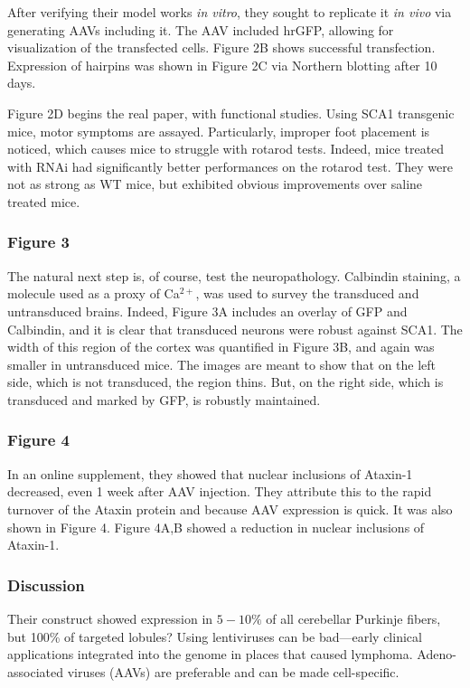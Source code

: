 \documentclass[12pt]{report}
\begin{document}
After verifying their model works \textit{in vitro}, they sought to replicate it \textit{in vivo} via generating AAVs including it. The AAV included hrGFP, allowing for visualization of the transfected cells. Figure 2B shows successful transfection. Expression of hairpins was shown in Figure 2C via Northern blotting after 10 days.\newline

Figure 2D begins the real paper, with functional studies. Using SCA1 transgenic mice, motor symptoms are assayed. Particularly, improper foot placement is noticed, which causes mice to struggle with rotarod tests. Indeed, mice treated with RNAi had significantly better performances on the rotarod test. They were not as strong as WT mice, but exhibited obvious improvements over saline treated mice. 

\subsubsection{Figure 3}

The natural next step is, of course, test the neuropathology. Calbindin staining, a molecule used as a proxy of Ca$^{2+}$, was used to survey the transduced and untransduced brains. Indeed, Figure 3A includes an overlay of GFP and Calbindin, and it is clear that transduced neurons were robust against SCA1. The width of this region of the cortex was quantified in Figure 3B, and again was smaller in untransduced mice. The images are meant to show that on the left side, which is not transduced, the region thins. But, on the right side, which is transduced and marked by GFP, is robustly maintained. 

\subsubsection{Figure 4}

In an online supplement, they showed that nuclear inclusions of Ataxin-1 decreased, even 1 week after AAV injection. They attribute this to the rapid turnover of the Ataxin protein and because AAV expression is quick. It was also shown in Figure 4. Figure 4A,B showed a reduction in nuclear inclusions of Ataxin-1. 

\subsubsection{Discussion}

Their construct showed expression in $5-10\%$ of all cerebellar Purkinje fibers, but 100\% of targeted lobules? Using lentiviruses can be bad---early clinical applications integrated into the genome in places that caused lymphoma. Adeno-associated viruses (AAVs) are preferable and can be made cell-specific. 
\end{document}
